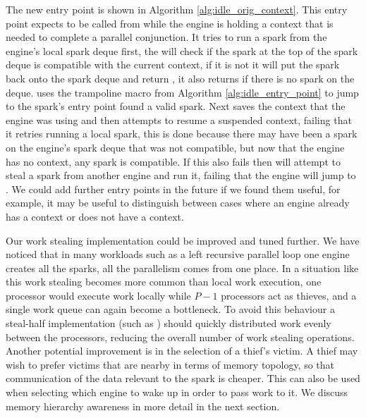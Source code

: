 The new entry point \idleorigcontext is shown in Algorithm
\ref{alg:idle_orig_context}.
This entry point expects to be called from \joinandcontinue while the engine
is holding a context that is needed to complete a parallel conjunction.
It tries to run a spark from the engine's local spark deque first,
the \tryrunlocalspark will check if the spark at the top of the spark deque
is compatible with the current context,
if it is not it will put the spark back onto the spark deque and return
\NULL, it also returns \NULL if there is no spark on the deque.
\idleorigcontext uses the trampoline macro from Algorithm
\ref{alg:idle_entry_point} to jump to the spark's entry point
\tryrunlocalspark found a valid spark.
Next \idleorigcontext saves the context that the engine was using and then
attempts to resume a suspended context,
failing that it retries running a local spark,
this is done because there may have been a spark on the engine's spark deque
that was not compatible, but now that the engine has no context, any spark
is compatible.
If this also fails then
\idleorigcontext will attempt to steal a spark from another engine and run
it,
failing that the engine will jump to \sleep.
We could add further entry points in the future if we found them useful,
for example,
it may be useful to distinguish between cases where an engine already has a
context or does not have a context.






Our work stealing implementation could be improved and tuned further.
We have noticed that in many workloads such as a left recursive parallel
loop one engine creates all the sparks, all the parallelism comes from one
place.
In a situation like this work stealing becomes more common than local work
execution,
one processor would execute work locally while $P - 1$ processors act as
thieves, and a single work queue can again become a bottleneck.
To avoid this behaviour
a steal-half implementation (such as \citet{hendler:2002:stealhalf})
should quickly distributed work evenly between the processors,
reducing the overall number of work stealing operations.
Another potential improvement is in the selection of a thief's victim.
A thief may wish to prefer victims that are nearby in terms of memory
topology, so that communication of the data relevant to the spark is
cheaper.
This can also be used when selecting which engine to wake up in order to
pass work to it.
We discuss memory hierarchy awareness in more detail in the next section.

